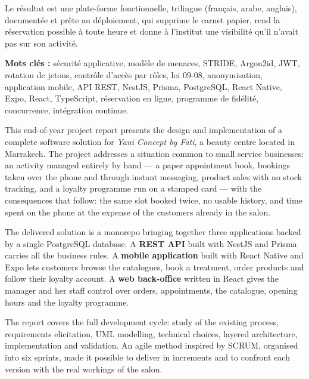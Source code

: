 \vspace{0.3cm}

Le résultat est une plate-forme fonctionnelle, trilingue (français, arabe,
anglais), documentée et prête au déploiement, qui supprime le carnet papier,
rend la réservation possible à toute heure et donne à l'institut une visibilité
qu'il n'avait pas sur son activité.

\vspace{0.6cm}

\textbf{Mots clés :} sécurité applicative, modèle de menaces, STRIDE, Argon2id,
JWT, rotation de jetons, contrôle d'accès par rôles, loi 09-08, anonymisation,
application mobile, API REST, NestJS, Prisma, PostgreSQL, React Native, Expo,
React, TypeScript, réservation en ligne, programme de fidélité, concurrence,
intégration continue.



This end-of-year project report presents the design and implementation of a
complete software solution for \textit{Yani Concept by Fati}, a beauty centre
located in Marrakech. The project addresses a situation common to small
service businesses: an activity managed entirely by hand --- a paper
appointment book, bookings taken over the phone and through instant messaging,
product sales with no stock tracking, and a loyalty programme run on a stamped
card --- with the consequences that follow: the same slot booked twice, no
usable history, and time spent on the phone at the expense of the customers
already in the salon.

\vspace{0.3cm}

The delivered solution is a monorepo bringing together three applications
backed by a single PostgreSQL database. A \textbf{REST API} built with NestJS
and Prisma carries all the business rules. A \textbf{mobile application} built
with React Native and Expo lets customers browse the catalogues, book a
treatment, order products and follow their loyalty account. A \textbf{web
back-office} written in React gives the manager and her staff control over
orders, appointments, the catalogue, opening hours and the loyalty programme.

\vspace{0.3cm}

The report covers the full development cycle: study of the existing process,
requirements elicitation, UML modelling, technical choices, layered
architecture, implementation and validation. An agile method inspired by SCRUM,
organised into six sprints, made it possible to deliver in increments and to
confront each version with the real workings of the salon.

